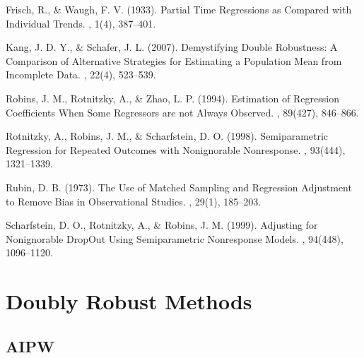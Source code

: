 \documentclass[letterpaper,10pt,english]{jupyterBook}
\begin{document}
\sphinxAtStartPar
Frisch, R., \& Waugh, F. V. (1933). Partial Time Regressions as Compared with Individual Trends. , 1(4), 387–401. 

\sphinxAtStartPar
Kang, J. D. Y., \& Schafer, J. L. (2007). Demystifying Double Robustness: A Comparison of Alternative Strategies for Estimating a Population Mean from Incomplete Data. , 22(4), 523–539. 

\sphinxAtStartPar
Robins, J. M., Rotnitzky, A., \& Zhao, L. P. (1994). Estimation of Regression Coefficients When Some Regressors are not Always Observed. , 89(427), 846–866. 

\sphinxAtStartPar
Rotnitzky, A., Robins, J. M., \& Scharfstein, D. O. (1998). Semiparametric Regression for Repeated Outcomes with Nonignorable Nonresponse. , 93(444), 1321–1339. 

\sphinxAtStartPar
Rubin, D. B. (1973). The Use of Matched Sampling and Regression Adjustment to Remove Bias in Observational Studies. , 29(1), 185–203. 

\sphinxAtStartPar
Scharfstein, D. O., Rotnitzky, A., \& Robins, J. M. (1999). Adjusting for Nonignorable Drop\sphinxhyphen{}Out Using Semiparametric Nonresponse Models. , 94(448), 1096–1120. 

\sphinxstepscope


\chapter{Doubly Robust Methods}
\label{\detokenize{DR_Methods:doubly-robust-methods}}\label{\detokenize{DR_Methods::doc}}

\section{AIPW}
\label{\detokenize{DR_Methods:aipw}}
\end{document}
